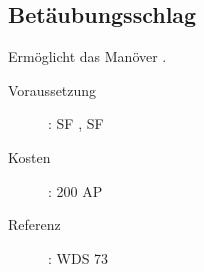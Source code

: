 \subsection{Betäubungsschlag}
\label{sf.betaeubungsschlag}
Ermöglicht das Manöver .
\begin{description}
    \item[Voraussetzung]:
        SF , SF 
    \item [Kosten]:
        200 AP
    \item [Referenz]:
        WDS 73
\end{description}
